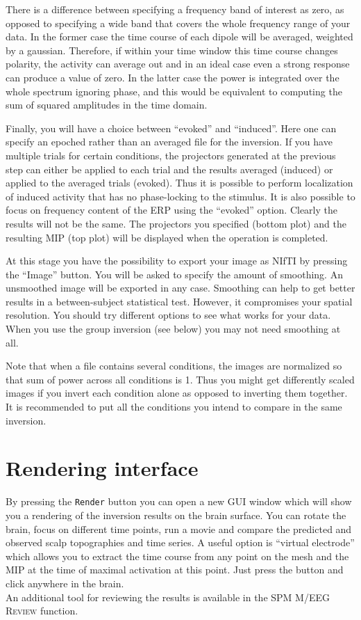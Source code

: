 There is a difference between specifying a frequency band of interest as zero, as opposed to specifying a wide band that covers the whole frequency range of your data. In the former case the time course of each dipole will be averaged, weighted by a gaussian. Therefore, if within your time window this time course changes polarity, the activity can average out and in an ideal case even a strong response can produce a value of zero. In the latter case the power is integrated over the whole spectrum ignoring phase, and this would be equivalent to computing the sum of squared amplitudes in the time domain.

Finally, you will have a choice between ``evoked'' and ``induced''. Here one can specify an epoched rather than an averaged file for the inversion. If you have multiple trials for certain conditions, the projectors generated at the previous step can either be applied to each trial and the results averaged (induced) or applied to the averaged trials (evoked). Thus it is possible to perform localization of induced activity that has no phase-locking to the stimulus. It is also possible to focus on frequency content of the ERP using the ``evoked'' option. Clearly the results will not be the same. The projectors you specified (bottom plot) and the resulting MIP (top plot) will be displayed when the operation is completed.

At this stage you have the possibility to export your image as NIfTI by pressing the ``Image'' button. You will be asked to specify the amount of smoothing. An unsmoothed image will be exported in any case. Smoothing can help to get better results in a between-subject statistical test. However, it compromises your spatial resolution. You should try different options to see what works for your data. When you use the group inversion (see below) you may not need smoothing at all.

Note that when a file contains several conditions, the images are normalized so that sum of power across all conditions is 1. Thus you might get differently scaled images if you invert each condition alone as opposed to inverting them together. It is recommended to put all the conditions you intend to compare in the same inversion.

\section{Rendering interface}
By pressing the \texttt{Render} button you can open a new GUI window which will show you a rendering of the inversion results on the brain surface. You can rotate the brain, focus on different time points, run a movie and compare the predicted and observed scalp topographies and time series. A useful option is ``virtual electrode'' which allows you to extract the time course from any point on the mesh and the MIP at the time of maximal activation at this point. Just press the button and click anywhere in the brain.\\
An additional tool for reviewing the results is available in the SPM M/EEG \textsc{Review} function.

